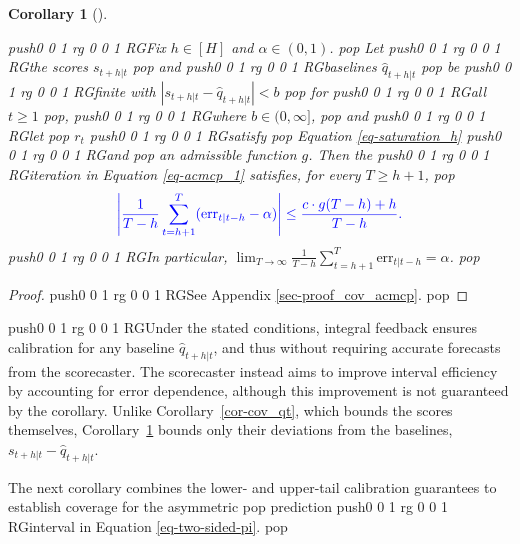 \documentclass[
  american,
  12pt]{article}
\theoremstyle{plain}
\theoremstyle{plain}
\newtheorem{corollary}{Corollary}[section]
\theoremstyle{remark}
\newcommand{\CPTSadd}[1]{\ifmmode\else\leavevmode\fi\pdfcolorstack 0 push{0 0 1 rg 0 0 1 RG}#1\pdfcolorstack 0 pop}
\begin{document}
\begin{corollary}[]\protect\hypertarget{cor-cov_acmcp}{}\label{cor-cov_acmcp}

\CPTSadd{Fix \(h\in[H]\) and \(\alpha\in(0,1)\).} Let \CPTSadd{the scores \(s_{t+h|t}\)} and
\CPTSadd{baselines \(\hat q_{t+h|t}\)} be \CPTSadd{finite with
\(|s_{t+h|t}-\hat q_{t+h|t}|<b\)} for \CPTSadd{all \(t\geq1\)}, \CPTSadd{where
\(b\in(0,\infty]\),} and \CPTSadd{let} \(r_t\) \CPTSadd{satisfy} Equation
\eqref{eq-saturation_h} \CPTSadd{and} an admissible function \(g\). Then the
\CPTSadd{iteration in Equation \eqref{eq-acmcp_1} satisfies, for every
\(T\geq h+1\),} \[
\CPTSadd{\left|\frac{1}{T-h}\sum_{t=h+1}^{T}(\mathrm{err}_{t|t-h}-\alpha)\right|
\leq \frac{c \cdot g(T-h)+h}{T-h}.}
\] \CPTSadd{In particular,
\(\lim_{T\to\infty}\frac{1}{T-h}\sum_{t=h+1}^{T}\mathrm{err}_{t|t-h}=\alpha\).}

\end{corollary}

\begin{proof}
\CPTSadd{See Appendix \ref{sec-proof_cov_acmcp}.}
\end{proof}

\CPTSadd{Under the stated conditions, integral feedback ensures calibration for
any baseline \(\hat q_{t+h|t}\), and thus without requiring accurate
forecasts from the scorecaster. The scorecaster instead aims to improve
interval efficiency by accounting for error dependence, although this
improvement is not guaranteed by the corollary. Unlike
Corollary~\ref{cor-cov_qt}, which bounds the scores themselves,
Corollary~\ref{cor-cov_acmcp} bounds only their deviations from the
baselines, \(s_{t+h|t}-\hat q_{t+h|t}\).

The next corollary combines the lower- and upper-tail calibration
guarantees to establish coverage for the asymmetric} prediction \CPTSadd{interval
in Equation \eqref{eq-two-sided-pi}.}
\end{document}
